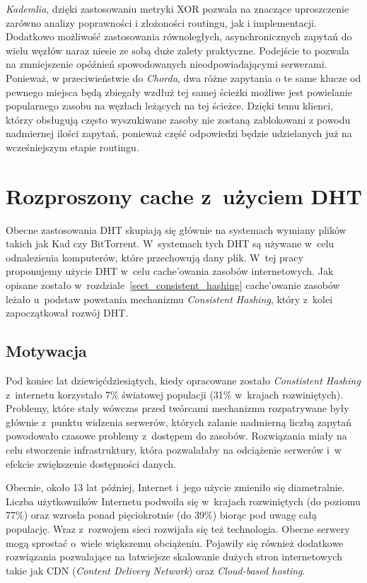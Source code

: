\documentclass[a4paper,11pt]{scrartcl}
\newcommand{\s}{ }
\newcommand{\kesz}{cache}
\newcommand{\keszowania}{cache'owania}
\newcommand{\keszowanie}{cache'owanie}
\begin{document}
\textit{Kademlia}, dzięki zastosowaniu metryki XOR pozwala na znaczące uproszczenie zarówno analizy poprawności i złożoności routingu, jak i implementacji. Dodatkowo możliwość zastosowania równoległych, asynchronicznych zapytań do wielu węzłów naraz niesie ze sobą duże zalety praktyczne. Podejście to pozwala na zmniejszenie opóźnień spowodowanych nieodpowiadającymi serwerami. Ponieważ, w przeciwieństwie do \textit{Chorda}, dwa różne zapytania o te same klucze od pewnego miejsca będą zbiegały wzdłuż tej samej ścieżki możliwe jest powielanie popularnego zasobu na węzłach leżących na tej ścieżce. Dzięki temu klienci, którzy obsługują często wyszukiwane zasoby nie zostaną zablokowani z powodu nadmiernej ilości zapytań, ponieważ część odpowiedzi będzie udzielanych już na wcześniejszym etapie routingu.

\section{Rozproszony \kesz\s z~użyciem DHT}
\label{sect_cache_dht}
Obecne zastosowania DHT skupiają się głównie na systemach wymiany plików takich jak Kad czy BitTorrent. W~systemach tych DHT są używane w~celu odnalezienia komputerów, które przechowują dany plik. W~tej pracy proponujemy użycie DHT w~celu \keszowania\s zasobów internetowych. Jak opisane zostało w~rozdziale~\ref{sect_consistent_hashing} \keszowanie\s zasobów leżało u~podstaw powstania mechanizmu \textit{Consistent Hashing}, który z~kolei zapoczątkował rozwój DHT.

\subsection{Motywacja}
Pod koniec lat dziewięćdziesiątych, kiedy opracowane zostało \textit{Constistent Hashing} z~internetu korzystało 7\% światowej populacji (31\% w~krajach rozwiniętych)\cite{wiki:GlobalStats}. Problemy, które stały wówczas przed twórcami mechanizmu rozpatrywane były głównie z~punktu widzenia serwerów, których zalanie nadmierną liczbą zapytań powodowało czasowe problemy z~dostępem do zasobów. Rozwiązania miały na celu stworzenie infrastruktury, która pozwalałaby na odciążenie serwerów i~w efekcie zwiększenie dostępności danych.

Obecnie, około 13 lat później, Internet i~jego użycie zmieniło się diametralnie. Liczba użytkowników Internetu podwoiła się w~krajach rozwiniętych (do poziomu 77\%) oraz wzrosła ponad pięciokrotnie (do 39\%) biorąc pod uwagę całą populację\cite{wiki:GlobalStats}. Wraz z~rozwojem sieci rozwijała się też technologia. Obecne serwery mogą sprostać o~wiele większemu obciążeniu. Pojawiły się również dodatkowe rozwiązania pozwalające na łatwiejsze skalowanie dużych stron internetowych takie jak CDN (\textit{Content Delivery Network}) oraz \textit{Cloud-based hosting}.
\end{document}
